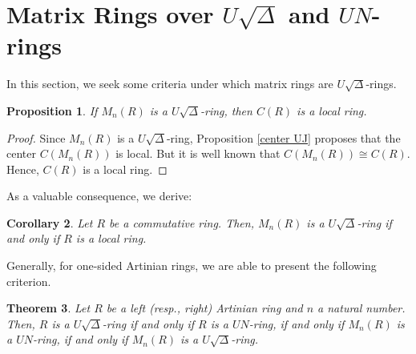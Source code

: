 \documentclass[11pt]{amsart}
\newtheorem{theorem}{Theorem}[section]
\newtheorem{proposition}[theorem]{Proposition}
\newtheorem{corollary}[theorem]{Corollary}
\theoremstyle{definition}
\begin{document}

\section{Matrix Rings over $U\sqrt{\Delta}$ and $UN$-rings}\label{sec3}

In this section, we seek some criteria under which matrix rings are \( U\sqrt{\Delta} \)-rings.

\begin{proposition}
If $M_n(R)$ is a $U\sqrt{\Delta}$-ring, then $C(R)$ is a local ring.
\end{proposition}

\begin{proof}
Since $M_n(R)$ is a $U\sqrt{\Delta}$-ring, Proposition \ref{center UJ} proposes that the center $C(M_n(R))$ is local. But it is well known that $C(M_n(R)) \cong C(R)$. Hence, $C(R)$ is a local ring.
\end{proof}

As a valuable consequence, we derive:

\begin{corollary}\label{mm}
Let $R$ be a commutative ring. Then, $M_n(R)$ is a $U\sqrt{\Delta}$-ring if and only if $R$ is a local ring.
\end{corollary}


Generally, for one-sided Artinian rings, we are able to present the following criterion.

\begin{theorem}\label{art}
Let $R$ be a left (resp., right) Artinian ring and $n$ a natural number. Then, $R$ is a $U\sqrt{\Delta}$-ring if and only if $R$ is a $UN$-ring, if and only if $M_n(R)$ is a $UN$-ring, if and only if $M_n(R)$ is a $U\sqrt{\Delta}$-ring.
\end{theorem}
\end{document}
